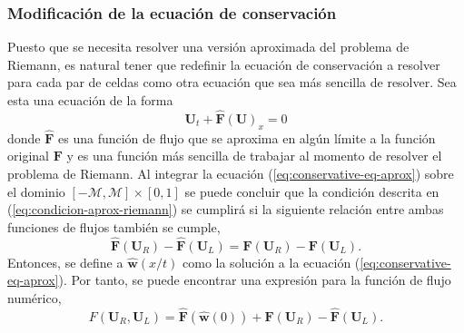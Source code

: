 \subsubsection{Modificación de la ecuación de conservación}
Puesto que se necesita resolver una versión aproximada del problema de Riemann, es natural tener que redefinir la ecuación de conservación a resolver para cada par de celdas como otra ecuación que sea más sencilla de resolver. Sea esta una ecuación de la forma 
\begin{equation}
	\mathbf{U}_t + \mathbf{\hat{F}}(\mathbf{U})_x = 0
	\label{eq:conservative-eq-aprox}
\end{equation}
donde $\mathbf{\hat{F}}$ es una función de flujo que se aproxima en algún límite a la función original $\mathbf{{F}}$ y es una función más sencilla de trabajar al momento de resolver el problema de Riemann. Al integrar la ecuación (\ref{eq:conservative-eq-aprox}) sobre el dominio $[-\mathcal{M}, \mathcal{M}] \times [0,1]$ se puede concluir que la condición descrita en (\ref{eq:condicion-aprox-riemann}) se cumplirá si la siguiente relación entre ambas funciones de flujos también se cumple,
\begin{equation}
	\mathbf{\hat{F}}(\mathbf{U}_R) - \mathbf{\hat{F}}(\mathbf{U}_L) = \mathbf{F}(\mathbf{U}_R) - \mathbf{F}(\mathbf{U}_L).
\end{equation}
Entonces, se define a $\mathbf{\hat{w}}(x/t)$ como la solución a la ecuación (\ref{eq:conservative-eq-aprox}). Por tanto, se puede encontrar una expresión para la función de flujo numérico,
\begin{equation}
	F(\mathbf{U}_R, \mathbf{U}_L) = \mathbf{\hat{F}}({\mathbf{\hat{w}}}(0)) +  \mathbf{F}(\mathbf{U}_R)-\mathbf{\hat{F}}(\mathbf{U}_L).
\end{equation}
